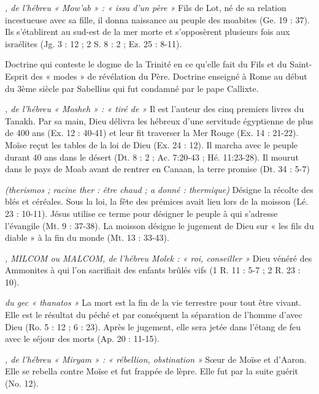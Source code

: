 \begin{multicols}{2}
\textit{, de l'hébreu « Mow'ab » : « issu d'un père »}\newline
Fils de Lot, né de sa relation incestueuse avec sa fille, il donna naissance au peuple des moabites (Ge. 19 : 37). Ils s'établirent au sud-est de la mer morte et s'opposèrent plusieurs fois aux israélites (Jg. 3 : 12 ; 2 S. 8 : 2 ; Ez. 25 : 8-11).

\textit{}\newline
Doctrine qui conteste le dogme de la Trinité en ce qu'elle fait du Fils et du Saint-Esprit des « modes » de révélation du Père. Doctrine enseigné à Rome au début du 3ème siècle par Sabellius qui fut condamné par le pape Callixte.

\textit{, de l'hébreu « Mosheh » : « tiré de »}\newline
Il est l'auteur des cinq premiers livres du Tanakh.
Par sa main, Dieu délivra les hébreux d'une servitude égyptienne de plus de 400 ans (Ex. 12 : 40-41) et leur fit traverser la Mer Rouge (Ex. 14 : 21-22). Moïse reçut les tables de la loi de Dieu (Ex. 24 : 12). Il marcha avec le peuple durant 40 ans dans le désert (Dt. 8 : 2 ; Ac. 7:20-43 ; Hé. 11:23-28). Il mourut dans le pays de Moab avant de rentrer en Canaan, la terre promise (Dt. 34 : 5-7)

\textit{(therismos ; racine ther : être chaud ; a donné : thermique)}\newline
Désigne la récolte des blés et céréales. Sous la loi, la fête des prémices avait lieu lors de la moisson (Lé. 23 : 10-11). Jésus utilise ce terme pour désigner le peuple à qui s'adresse l'évangile (Mt. 9 : 37-38). La moisson désigne le jugement de Dieu sur « les fils du diable » à la fin du monde (Mt. 13 : 33-43).

\textit{, MILCOM ou MALCOM, de l'hébreu Molek : « roi, conseiller »}\newline
Dieu vénéré des Ammonites à qui l'on sacrifiait des enfants brûlés vifs (1 R. 11 : 5-7 ; 2 R. 23 : 10).

\textit{du gec « thanatos »}\newline
La mort est la fin de la vie terrestre pour tout être vivant. Elle est le résultat du péché et par conséquent la séparation de l'homme d'avec Dieu (Ro. 5 : 12 ; 6 : 23). Après le jugement, elle sera jetée dans l'étang de feu avec le séjour des morts (Ap. 20 : 11-15).

\textit{, de l'hébreu « Miryam » : « rébellion, obstination »}\newline
Sœur de Moïse et d'Aaron. Elle se rebella contre Moïse et fut frappée de lèpre. Elle fut par la suite guérit (No. 12).


\end{multicols}
